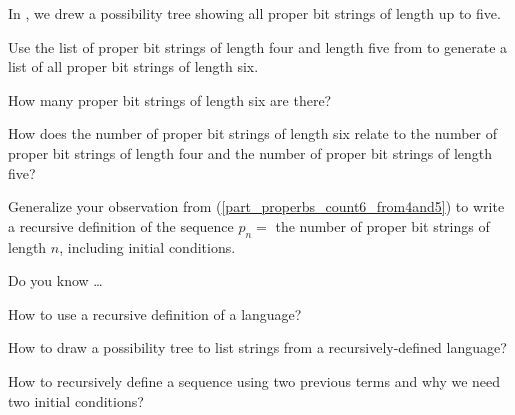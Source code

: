 \begin{exer}[\exerU] %
\label{exer_properbs_length6}
    In , we drew a possibility tree showing all proper bit strings of length up to five.  
    \begin{exerpart}
        \item Use the list of proper bit strings of length four and length five from  to generate a list of all proper bit strings of length six.  
        \item How many proper bit strings of length six are there?
        \item \label{part_properbs_count6_from4and5} How does the number of proper bit strings of length six relate to the number of proper bit strings of length four and the number of proper bit strings of length five?
    \end{exerpart} 
\end{exer}

\begin{exer}[\exerU] %
\label{exer_properbs_count}
    Generalize your observation from (\ref{part_properbs_count6_from4and5}) to write a recursive definition of the sequence $p_n=$ the number of proper bit strings of length $n$, including initial conditions. 
\end{exer}

\begin{exer}[\exerR] %
\label{exer_dyk_proper_bs}
    Do you know \ldots
        \begin{exerpart}
            \item How to use a recursive definition of a language?
            \item How to draw a possibility tree to list strings from a recursively-defined language?
            \item How to recursively define a sequence using two previous terms and why we need two initial conditions?
        \end{exerpart}
\end{exer}

